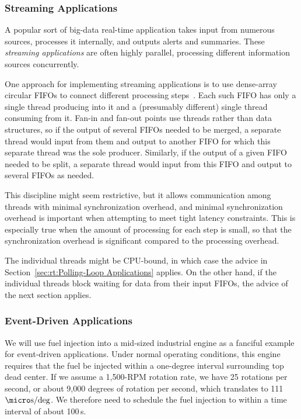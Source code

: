 \subsubsection{Streaming Applications}
\label{sec:rt:Streaming Applications}

A popular sort of big-data real-time application takes input from numerous
sources, processes it internally, and outputs alerts and summaries.
These \emph{streaming applications} are often highly parallel, processing
different information sources concurrently.

One approach for implementing streaming applications is to use
dense-array circular FIFOs to connect different processing
steps~\cite{AdrianSutton2013LCA:Disruptor}.
Each such FIFO has only a single thread producing into it and a
(presumably different) single thread consuming from it.
Fan-in and fan-out points use threads rather than data structures,
so if the output of several FIFOs needed to be merged, a separate
thread would input from them and output to another FIFO for which
this separate thread was the sole producer.
Similarly, if the output of a given FIFO needed to be split, a separate
thread would input from this FIFO and output to several FIFOs as needed.

This discipline might seem restrictive, but it allows communication
among threads with minimal synchronization overhead, and minimal
synchronization overhead is important when attempting to meet
tight latency constraints.
This is especially true when the amount of processing for each step
is small, so that the synchronization overhead is significant compared
to the processing overhead.

The individual threads might be CPU-bound, in which case the advice in
Section~\ref{sec:rt:Polling-Loop Applications} applies.
On the other hand, if the individual threads block waiting for
data from their input FIFOs, the advice of the next section applies.

\subsubsection{Event-Driven Applications}
\label{sec:rt:Event-Driven Applications}

We will use fuel injection into a mid-sized industrial engine as a
fanciful example for event-driven applications.
Under normal operating conditions, this engine requires that the fuel
be injected within a one-degree interval surrounding top dead center.
If we assume a 1,500-RPM rotation rate, we have 25 rotations per second,
or about 9,000 degrees of rotation per second, which translates to
111\,$\micro \mathrm{s}/\mathrm{deg}$.
We therefore need to schedule the fuel injection to within a time
interval of about 100\,\micro s.

